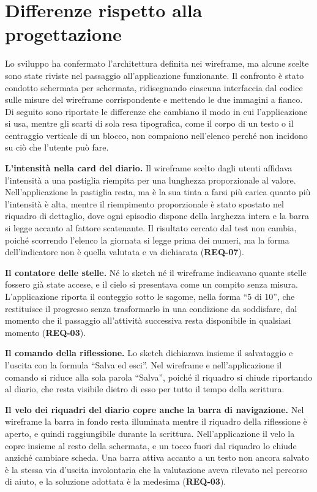 \section{Differenze rispetto alla progettazione}
\label{sec:differenze}

Lo sviluppo ha confermato l'architettura definita nei wireframe, ma alcune scelte sono state riviste nel passaggio all'applicazione funzionante.
Il confronto è stato condotto schermata per schermata, ridisegnando ciascuna interfaccia dal codice sulle misure del wireframe corrispondente e mettendo le due immagini a fianco.
Di seguito sono riportate le differenze che cambiano il modo in cui l'applicazione si usa, mentre gli scarti di sola resa tipografica, come il corpo di un testo o il centraggio verticale di un blocco, non compaiono nell'elenco perché non incidono su ciò che l'utente può fare.

\textbf{L'intensità nella card del diario.}
Il wireframe scelto dagli utenti affidava l'intensità a una pastiglia riempita per una lunghezza proporzionale al valore.
Nell'applicazione la pastiglia resta, ma è la sua tinta a farsi più carica quanto più l'intensità è alta, mentre il riempimento proporzionale è stato spostato nel riquadro di dettaglio, dove ogni episodio dispone della larghezza intera e la barra si legge accanto al fattore scatenante.
Il risultato cercato dal test non cambia, poiché scorrendo l'elenco la giornata si legge prima dei numeri, ma la forma dell'indicatore non è quella valutata e va dichiarata (\textbf{REQ-07}).

\textbf{Il contatore delle stelle.}
Né lo sketch né il wireframe indicavano quante stelle fossero già state accese, e il cielo si presentava come un compito senza misura.
L'applicazione riporta il conteggio sotto le sagome, nella forma \enquote{5 di 10}, che restituisce il progresso senza trasformarlo in una condizione da soddisfare, dal momento che il passaggio all'attività successiva resta disponibile in qualsiasi momento (\textbf{REQ-03}).

\textbf{Il comando della riflessione.}
Lo sketch dichiarava insieme il salvataggio e l'uscita con la formula \enquote{Salva ed esci}.
Nel wireframe e nell'applicazione il comando si riduce alla sola parola \enquote{Salva}, poiché il riquadro si chiude riportando al diario, che resta visibile dietro di esso per tutto il tempo della scrittura.

\textbf{Il velo dei riquadri del diario copre anche la barra di navigazione.}
Nel wireframe la barra in fondo resta illuminata mentre il riquadro della riflessione è aperto, e quindi raggiungibile durante la scrittura.
Nell'applicazione il velo la copre insieme al resto della schermata, e un tocco fuori dal riquadro lo chiude anziché cambiare scheda.
Una barra attiva accanto a un testo non ancora salvato è la stessa via d'uscita involontaria che la valutazione aveva rilevato nel percorso di aiuto, e la soluzione adottata è la medesima (\textbf{REQ-03}).

